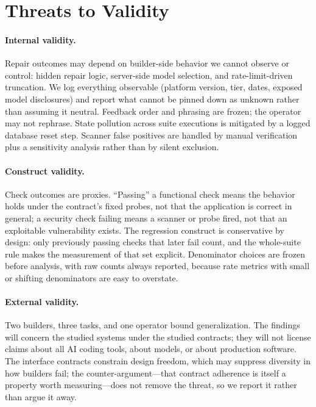 \section{Threats to Validity}

\paragraph{Internal validity.} Repair outcomes may depend on builder-side behavior we
cannot observe or control: hidden repair logic, server-side model selection, and
rate-limit-driven truncation. We log everything observable (platform version, tier,
dates, exposed model disclosures) and report what cannot be pinned down as unknown
rather than assuming it neutral. Feedback order and phrasing are frozen; the operator
may not rephrase. State pollution across suite executions is mitigated by a logged
database reset step. Scanner false positives are handled by manual verification plus a
sensitivity analysis rather than by silent exclusion.

\paragraph{Construct validity.} Check outcomes are proxies. ``Passing'' a functional
check means the behavior holds under the contract's fixed probes, not that the
application is correct in general; a security check failing means a scanner or probe
fired, not that an exploitable vulnerability exists. The regression construct is
conservative by design: only previously passing checks that later fail count, and the
whole-suite rule makes the measurement of that set explicit. Denominator choices are
frozen before analysis, with raw counts always reported, because rate metrics with
small or shifting denominators are easy to overstate.

\paragraph{External validity.} Two builders, three tasks, and one operator bound
generalization. The findings will concern the studied systems under the studied
contracts; they will not license claims about all AI coding tools, about models, or
about production software. The interface contracts constrain design freedom, which
may suppress diversity in how builders fail; the counter-argument---that
contract adherence is itself a property worth measuring---does not remove the threat,
so we report it rather than argue it away.

